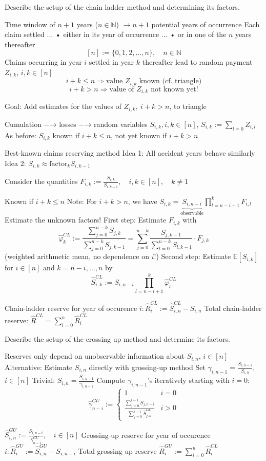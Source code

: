 \documentclass[11pt,a4paper,twoside]{article}
\begin{document}
Describe the setup of the chain ladder method and determining its factors.


Time window of \( n + 1 \) years (\( n \in \mathbb{N} \))
\(\rightarrow n + 1 \) potential years of occurrence
Each claim settled ...
• either in its year of occurrence ...
• or in one of the \( n \) years thereafter
\[
[n] := \{0, 1, 2, \ldots, n\}, \quad n \in \mathbb{N}
\]
Claims occurring in year \( i \) settled in year \( k \) thereafter lead to random payment \( Z_{i,k} \),  
\( i, k \in [n] \)
\[
i + k \leq n \Longrightarrow \text{value } Z_{i,k} \text{ known (cf. triangle)}
\]
\[
i + k > n \Longrightarrow \text{value of } Z_{i,k} \text{ not known yet!}
\]

Goal: Add estimates for the values of \( Z_{i,k},\ i + k > n \), to triangle

Cumulation −→ losses
−→ random variables \( S_{i,k} , i, k ∈ [n] \), \( S_{i,k} := \sum_{l=0} Z_{i,l}\)
As before: \( S_{i,k} \) known if \( i+k \leq n \), not yet known if \( i + k > n \)


Best-known claims reserving method
Idea 1: All accident years behave similarly
Idea 2: \( S_{i,k} \approx \text{factor}_k S_{i,k-1} \)

Consider the quantities
\(
F_{i,k} := \frac{S_{i,k}}{S_{i,k-1}}, \quad i, k \in [n], \quad k \ne 1
\)

Known if \( i + k \le n \)
Note: For \( i + k > n \), we have
\(
S_{i,k} = \underbrace{S_{i,n-i}}_{\text{observable}} \prod_{l = n - i + 1}^{k} F_{i,l}
\)
Estimate the unknown factors!
First step: Estimate \( F_{i,k} \) with
\[
\hat{\varphi}_k^{CL} := \frac{\sum_{j=0}^{n-k} S_{j,k}}{\sum_{j=0}^{n-k} S_{j,k-1}} = \sum_{j=0}^{n-k} \frac{S_{j,k-1}}{\sum_{l=0}^{n-k} S_{l,k-1}} \cdot F_{j,k}
\]
(weighted arithmetic mean, no dependence on \( i \)!)
Second step: Estimate \( \mathbb{E}[S_{i,k}] \) for \( i \in [n] \) and \( k = n - i, \ldots, n \) by
\[
\hat{S}_{i,k}^{CL} := S_{i,n-i} \prod_{l = n - i + 1}^{k} \hat{\varphi}_l^{CL}
\]

Chain-ladder reserve for year of occurence \( i: \hat{R}_{i}^{CL} := \hat{S}_{i,n}^{CL} - S_{i,n} \)
Total chain-ladder reserve: \( \hat{R}^{CL} = \sum_{i=0}^n \hat{R}_{i}^{CL} \)


Describe the setup of the crossing up method and determine its factors.

Reserves only depend on unobservable information about \(S_{i,n}\), \(i \in [n]\)
Alternative: Estimate \(S_{i,n}\) directly with grossing-up method
Set \(\gamma_{i,n-1} = \frac{S_{i,n-1}}{S_{i,n}}\), \(i \in [n]\)
Trivial: 
\(S_{i,n} = \frac{S_{i,n-1}}{\gamma_{i,n-1}}\) 
Compute 
\(\gamma_{i,n-1}\)'s iteratively starting with \(i = 0\): 
\[\hat{\gamma}_{n-i}^{GU} :=
\begin{cases}
1 & i = 0 \\
\frac{\sum_{j=0}^{i-1} S_{j,n-i}}{\sum_{j=0}^{i-1} \hat{S}_{j,n}^{GU}} & i > 0
\end{cases}\] 

\(
\hat{S}_{i,n}^{GU} := \frac{S_{i,n-i}}{\hat{\gamma}_{n-i}^{GU}}, \quad i \in [n]
\)
Grossing-up reserve for year of occurence \( i: \hat{R}_{i}^{GU} := \hat{S}_{i,n}^{GU} - S_{i,n-i} \)
Total grossing-up reserve \( \hat{R}_{i}^{GU} := \sum_{i=0}^n \hat{R}_{i}^{CL} \)
\end{document}
